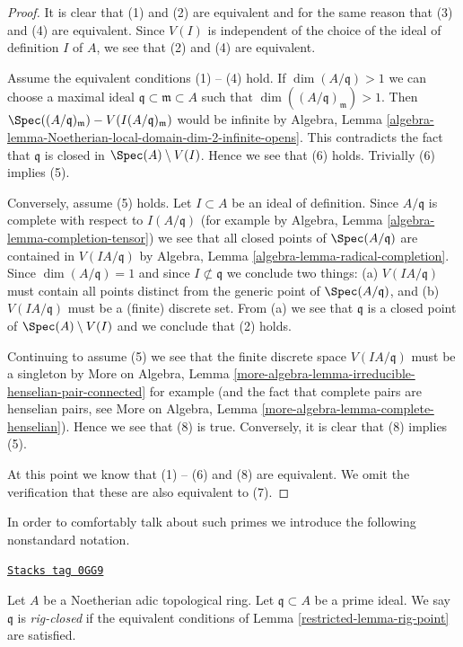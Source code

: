 \begin{proof}
It is clear that (1) and (2) are equivalent and for the same reason
that (3) and (4) are equivalent.
Since $V(I)$ is independent of the choice of the ideal of definition
$I$ of $A$, we see that (2) and (4) are equivalent.

\medskip\noindent
Assume the equivalent conditions (1) -- (4) hold.
If $\dim(A/\mathfrak q) > 1$ we can choose a maximal
ideal $\mathfrak q \subset \mathfrak m \subset A$
such that $\dim((A/\mathfrak q)_\mathfrak m) > 1$.
Then $\Spec((A/\mathfrak q)_\mathfrak m) - V(I(A/\mathfrak q)_\mathfrak m)$
would be infinite by Algebra, Lemma
\ref{algebra-lemma-Noetherian-local-domain-dim-2-infinite-opens}.
This contradicts the fact that $\mathfrak q$ is closed in
$\Spec(A) \setminus V(I)$.
Hence we see that (6) holds. Trivially (6) implies (5).

\medskip\noindent
Conversely, assume (5) holds. Let $I \subset A$ be an ideal of definition.
Since $A/\mathfrak q$ is complete
with respect to $I(A/\mathfrak q)$ (for example by
Algebra, Lemma \ref{algebra-lemma-completion-tensor})
we see that all closed points of $\Spec(A/\mathfrak q)$ are
contained in $V(IA/\mathfrak q)$ by
Algebra, Lemma \ref{algebra-lemma-radical-completion}.
Since $\dim(A/\mathfrak q) = 1$ and since $I \not \subset \mathfrak q$
we conclude two things: (a) $V(IA/\mathfrak q)$ must contain
all points distinct from the generic point of $\Spec(A/\mathfrak q)$, and
(b) $V(IA/\mathfrak q)$ must be a (finite) discrete set.
From (a) we see that $\mathfrak q$ is a closed point of
$\Spec(A) \setminus V(I)$ and we conclude that (2) holds.

\medskip\noindent
Continuing to assume (5) we see that the finite discrete space
$V(IA/\mathfrak q)$ must be a singleton by More on Algebra, Lemma
\ref{more-algebra-lemma-irreducible-henselian-pair-connected}
for example (and the fact that complete pairs are henselian pairs, see
More on Algebra, Lemma \ref{more-algebra-lemma-complete-henselian}).
Hence we see that (8) is true.
Conversely, it is clear that (8) implies (5).

\medskip\noindent
At this point we know that (1) -- (6) and (8) are equivalent.
We omit the verification that these are also equivalent to (7).
\end{proof}

In order to comfortably talk about such primes we introduce
the following nonstandard notation.

\begin{definition}
\label{restricted-definition-rig-closed}
\href{https://stacks.math.columbia.edu/tag/0GG9}{\texttt{Stacks tag 0GG9}}

Let $A$ be a Noetherian adic topological ring. Let
$\mathfrak q \subset A$ be a prime ideal. We say
$\mathfrak q$ is {\it rig-closed} if the equivalent
conditions of Lemma \ref{restricted-lemma-rig-point} are satisfied.
\end{definition}

